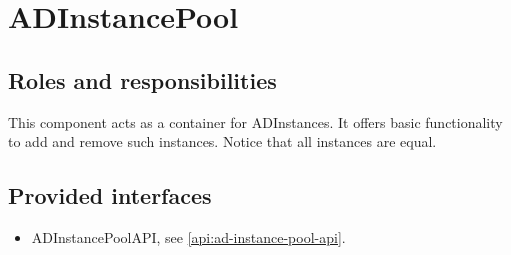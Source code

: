 \section{ADInstancePool}
\label{element:ad-instance-pool}

\subsection{Roles and responsibilities}

\npar This component acts as a container for ADInstances. It offers basic
functionality to add and remove such instances. Notice that all instances
are equal.

\subsection{Provided interfaces}

\begin{itemize}
  \item ADInstancePoolAPI, see \ref{api:ad-instance-pool-api}.
\end{itemize}



